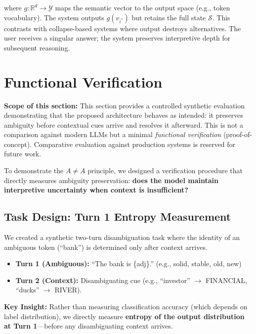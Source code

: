 \documentclass[11pt,a4paper]{article}
\begin{document}
where $g: \mathbb{R}^d \to \mathcal{Y}$ maps the semantic vector to the output space (e.g., token vocabulary). The system outputs $g(v_{i^*})$ but retains the full state $\mathcal{S}$. This contrasts with collapse-based systems where output destroys alternatives. The user receives a singular answer; the system preserves interpretive depth for subsequent reasoning.

\section{Functional Verification}
\label{sec:minimal_experiment}

\textbf{Scope of this section:} This section provides a controlled synthetic evaluation demonstrating that the proposed architecture behaves as intended: it preserves ambiguity before contextual cues arrive and resolves it afterward. This is not a comparison against modern LLMs but a minimal \textit{functional verification} (proof-of-concept). Comparative evaluation against production systems is reserved for future work.

\vspace{0.5em}

To demonstrate the $A \neq A$ principle, we designed a verification procedure that directly measures ambiguity preservation: \textbf{does the model maintain interpretive uncertainty when context is insufficient?}

\subsection{Task Design: Turn 1 Entropy Measurement}

We created a synthetic two-turn disambiguation task where the identity of an ambiguous token (``bank'') is determined only after context arrives.
\begin{itemize}
    \item \textbf{Turn 1 (Ambiguous):} ``The bank is \{adj\}.'' (e.g., solid, stable, old, new)
    \item \textbf{Turn 2 (Context):} Disambiguating cue (e.g., ``investor'' $\to$ FINANCIAL, ``ducks'' $\to$ RIVER).
\end{itemize}

\textbf{Key Insight:} Rather than measuring classification accuracy (which depends on label distribution), we directly measure \textbf{entropy of the output distribution at Turn 1}---before any disambiguating context arrives.
\end{document}
